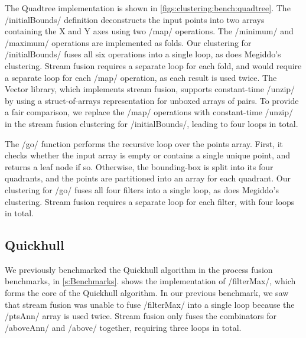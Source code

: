 The Quadtree implementation is shown in \cref{figs:clustering:bench:quadtree}.
The \Hs/initialBounds/ definition deconstructs the input points into two arrays containing the X and Y axes using two \Hs/map/ operations.
The \Hs/minimum/ and \Hs/maximum/ operations are implemented as folds.
Our clustering for \Hs/initialBounds/ fuses all six operations into a single loop, as does Megiddo's clustering.
Stream fusion requires a separate loop for each fold, and would require a separate loop for each \Hs/map/ operation, as each result is used twice.
The Vector library, which implements stream fusion, supports constant-time \Hs/unzip/ by using a struct-of-arrays representation for unboxed arrays of pairs.
To provide a fair comparison, we replace the \Hs/map/ operations with constant-time \Hs/unzip/ in the stream fusion clustering for \Hs/initialBounds/, leading to four loops in total.

The \Hs/go/ function performs the recursive loop over the points array.
First, it checks whether the input array is empty or contains a single unique point, and returns a leaf node if so.
Otherwise, the bounding-box is split into its four quadrants, and the points are partitioned into an array for each quadrant.
Our clustering for \Hs/go/ fuses all four filters into a single loop, as does Megiddo's clustering.
Stream fusion requires a separate loop for each filter, with four loops in total.


\subsection{Quickhull}
We previously benchmarked the Quickhull algorithm in the process fusion benchmarks, in \cref{s:Benchmarks}.
 shows the implementation of \Hs/filterMax/, which forms the core of the Quickhull algorithm.
In our previous benchmark, we saw that stream fusion was unable to fuse \Hs/filterMax/ into a single loop because the \Hs/ptsAnn/ array is used twice.
Stream fusion only fuses the combinators for \Hs/aboveAnn/ and \Hs/above/ together, requiring three loops in total.

